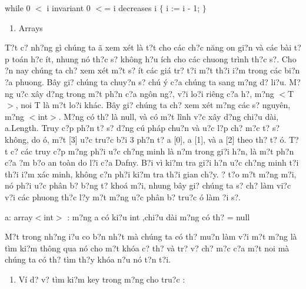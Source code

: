 \documentclass{article} %
\begin{document}
\noindent 

\noindent 

\noindent 

\noindent  while 0 $<$ i      invariant 0 $<$= i      decreases i   $\{$      i := i - 1;   $\}$

\begin{enumerate}
\item  Arrays
\end{enumerate}

T?t c? nh?ng g\`{i} ch\'{u}ng ta {\dj}\~{a} xem x\'{e}t l\`{a} t?t cho c\'{a}c ch?c n\u{a}ng {\dj}on gi?n v\`{a} c\'{a}c b\`{a}i t?p to\'{a}n h?c \'{i}t, nhung n\'{o} th?c s? kh\^{o}ng h?u \'{i}ch cho c\'{a}c chuong tr\`{i}nh th?c s?. Cho {\dj}?n nay ch\'{u}ng ta ch? xem x\'{e}t m?t s? \'{i}t c\'{a}c gi\'{a} tr? t?i m?t th?i {\dj}i?m trong c\'{a}c bi?n {\dj}?a phuong. B\^{a}y gi? ch\'{u}ng ta chuy?n s? ch\'{u} \'{y} c?a ch\'{u}ng ta sang m?ng d? li?u. M?ng {\dj}u?c x\^{a}y d?ng trong m?t ph?n c?a ng\^{o}n ng?, v?i lo?i ri\^{e}ng c?a h?, m?ng $<$T$>$, noi T l\`{a} m?t lo?i kh\'{a}c. B\^{a}y gi? ch\'{u}ng ta ch? xem x\'{e}t m?ng c\'{a}c s? nguy\^{e}n, m?ng $<$int$>$. M?ng c\'{o} th? l\`{a} null, v\`{a} c\'{o} m?t l\~{i}nh v?c x\^{a}y d?ng chi?u d\`{a}i, a.Length. Truy c?p ph?n t? s? d?ng c\'{u} ph\'{a}p chu?n v\`{a} {\dj}u?c l?p ch? m?c t? s? kh\^{o}ng, do {\dj}\'{o}, m?t [3] {\dj}u?c tru?c b?i 3 ph?n t? a [0], a [1], v\`{a} a [2] theo th? t? {\dj}\'{o}. T?t c? c\'{a}c truy c?p m?ng ph?i {\dj}u?c ch?ng minh l\`{a} n?m trong gi?i h?n, l\`{a} m?t ph?n c?a {\dj}?m b?o an to\`{a}n do l?i c?a Dafny. B?i v\`{i} ki?m tra gi?i h?n {\dj}u?c ch?ng minh t?i th?i {\dj}i?m x\'{a}c minh, kh\^{o}ng c?n ph?i ki?m tra th?i gian ch?y. {\DJ}? t?o m?t m?ng m?i, n\'{o} ph?i {\dj}u?c ph\^{a}n b? b?ng t? kho\'{a} m?i, nhung b\^{a}y gi? ch\'{u}ng ta s? ch? l\`{a}m vi?c v?i c\'{a}c phuong th?c l?y m?t m?ng {\dj}u?c ph\^{a}n b? tru?c {\dj}\'{o} l\`{a}m {\dj}?i s?.

\noindent a: array$<$int$>$ : m?ng a c\'{o} ki?u int ,chi?u d\`{a}i m?ng c\'{o} th? = null 

\noindent M?t trong nh?ng {\dj}i?u co b?n nh?t m\`{a} ch\'{u}ng ta c\'{o} th? mu?n l\`{a}m v?i m?t m?ng l\`{a} t\`{i}m ki?m th\^{o}ng qua n\'{o} cho m?t kh\'{o}a c? th? v\`{a} tr? v? ch? m?c c?a m?t noi m\`{a} ch\'{u}ng ta c\'{o} th? t\`{i}m th?y kh\'{o}a n?u n\'{o} t?n t?i.

\begin{enumerate}
\item  V\'{i} d? v? t\`{i}m ki?m key trong m?ng cho tru?c :
\end{enumerate}
\end{document}
